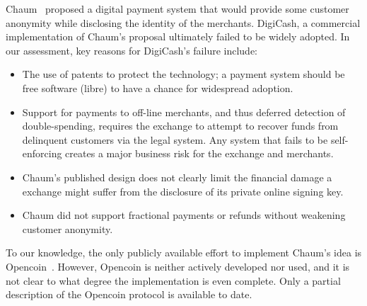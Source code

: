 \documentclass{llncs}
\begin{document}
Chaum~\cite{chaum1983blind} proposed a digital payment system that
would provide some customer anonymity while disclosing the identity of
the merchants.  DigiCash, a commercial implementation of Chaum's
proposal ultimately failed to be widely adopted.  In our assessment,
key reasons for DigiCash's failure include:

\begin{itemize}
 \item The use of patents to protect the technology; a payment system
   should be free software (libre) to have a chance for widespread adoption.
 \item Support for payments to off-line merchants, and thus deferred
   detection of double-spending, requires the exchange to attempt to
   recover funds from delinquent customers via the legal system.
   Any system that fails to be self-enforcing creates a major
   business risk for the exchange and merchants.
 \item %
   Chaum's published design does not clearly
   limit the financial damage a exchange might suffer from the
   disclosure of its private online signing key.
 \item Chaum did not support fractional payments or refunds without
   weakening customer anonymity.
\end{itemize}

To our knowledge, the only publicly available effort to implement
Chaum's idea is Opencoin~\cite{dent2008extensions}.  However, Opencoin
is neither actively developed nor used, and it is not clear
to what degree the implementation is even complete.  Only a partial
description of the Opencoin protocol is available to date.
\end{document}
